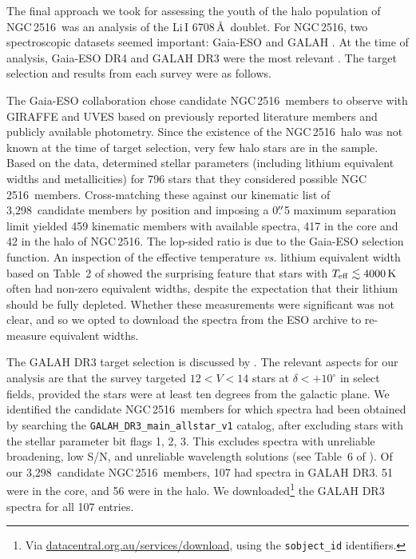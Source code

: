 \documentclass[12pt,twocolumn,tighten]{aastex63}
\newcommand{\cn}{NGC\,2516} %
\newcommand{\nkinematic}{3{,}298} %
\begin{document}
The final approach we took for assessing the youth of the
halo population of \cn\ was an analysis of the Li\,\textsc{I}
6708\,\AA\ doublet.  
For \cn, two spectroscopic datasets seemed important:
Gaia-ESO \citep{gilmore_gaiaeso_2012} and GALAH
\citep{silva_galah_2015}.  At the time of analysis, Gaia-ESO DR4 and
GALAH DR3 were the most relevant
\citep{randich_gaiaeso_2018,buder_galah_2020}.  The target selection
and results from each survey were as follows.

The Gaia-ESO collaboration chose candidate \cn\ members to observe
with GIRAFFE and UVES based on previously reported literature members
and publicly available photometry.  Since the existence of the \cn\
halo was not known at the time of target selection, very few halo
stars are in the sample.  Based on the data,
\citet{randich_gaiaeso_2018} determined stellar parameters (including
lithium equivalent widths and metallicities) for 796 stars that they
considered possible \cn\ members.  Cross-matching these against our
kinematic list of \nkinematic\ candidate members by position and
imposing a 0$\mbox{$.\!\!^{\prime\prime}$}$5 maximum separation limit yielded 459 kinematic
members with available spectra, 417 in the core and 42 in the halo of
\cn.  The lop-sided ratio is due to the Gaia-ESO selection function.
An inspection of the effective temperature {\it vs{.}} lithium
equivalent width based on Table~2 of \citet{randich_gaiaeso_2018}
showed the surprising feature that stars with $T_{\rm eff}\lesssim
4000\,{\rm K}$ often had non-zero equivalent widths, despite the
expectation that their lithium should be fully depleted.  Whether
these measurements were significant was not clear, and so we opted to
download the spectra from the ESO archive to re-measure equivalent
widths.

The GALAH DR3 target selection is discussed by
\citet{buder_galah_2020}.  The relevant aspects for our analysis are
that the survey targeted $12<V<14$ stars at
$\delta<+10^\circ$ in select fields, provided the stars were at least
ten degrees from the galactic plane.  We identified the candidate \cn\ members
for which spectra had been obtained by searching the
\texttt{GALAH\_DR3\_main\_allstar\_v1} catalog, after excluding stars
with the stellar parameter bit flags 1, 2, 3.  This excludes spectra
with unreliable broadening, low S/N, and unreliable wavelength
solutions (see Table~6 of \citealt{buder_galah_2020}).
Of our \nkinematic\ candidate \cn\ members, 107 had spectra in GALAH
DR3.  51 were in the core, and 56 were in the halo.  We
downloaded\footnote{Via \url{datacentral.org.au/services/download},
using the \texttt{sobject\_id} identifiers.} the GALAH DR3 spectra for
all 107 entries.  
\end{document}
